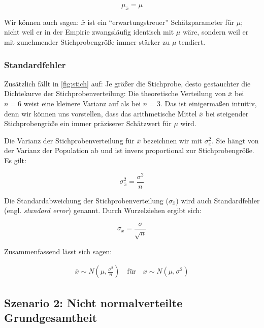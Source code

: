 \documentclass[
  11pt,
  ngerman,
  a4paper,
]{report}
\begin{document}
\nopagebreak

\[
\mu_{\bar{x}} = \mu
\label{eq:mean}
\]

Wir können auch sagen: \(\bar{x}\) ist ein \enquote{erwartungstreuer} Schätzparameter für \(\mu\); nicht weil er in der Empirie zwangsläufig identisch mit \(\mu\) wäre, sondern weil er mit zunehmender Stichprobengröße immer stärker zu \(\mu\) tendiert.

\hypertarget{standardfehler}{%
\subsubsection{Standardfehler}\label{standardfehler}}

Zusätzlich fällt in \ref{fig:stich} auf: Je größer die Stichprobe, desto gestauchter die Dichtekurve der Stichprobenverteilung: Die theoretische Verteilung von \(\bar{x}\) bei \(n=6\) weist eine kleinere Varianz auf als bei \(n=3\). Das ist einigermaßen intuitiv, denn wir können uns vorstellen, dass das arithmetische Mittel \(\bar{x}\) bei steigender Stichprobengröße ein immer präziserer Schätzwert für \(\mu\) wird.

Die Varianz der Stichprobenverteilung für \(\bar{x}\) bezeichnen wir mit \(\sigma^2_{\bar{x}}\). Sie hängt von der Varianz der Population ab und ist invers proportional zur Stichprobengröße. Es gilt:

\nopagebreak

\[
\sigma^2_{\bar{x}} = \frac{\sigma^2}{n}
\label{eq:4var}
\]

Die Standardabweichung der Stichprobenverteilung (\(\sigma_{\bar{x}}\)) wird auch Standardfehler (engl. \emph{standard error}) genannt. Durch Wurzelziehen ergibt sich:

\nopagebreak

\[
\sigma_{\bar{x}} = \frac{\sigma}{\sqrt{n}} \label{eq:4sd}
\]

Zusammenfassend lässt sich sagen:

\nopagebreak

\[
\begin{aligned}
\bar{x} \sim N(\mu, {\textstyle \frac{\sigma^2}{n}}) \quad \textrm{für} \quad x\sim N(\mu, \sigma^2)
\end{aligned}
\label{eq:4norm}
\]

\hypertarget{szenario-2-nicht-normalverteilte-grundgesamtheit}{%
\subsection{Szenario 2: Nicht normalverteilte Grundgesamtheit}\label{szenario-2-nicht-normalverteilte-grundgesamtheit}}
\end{document}
